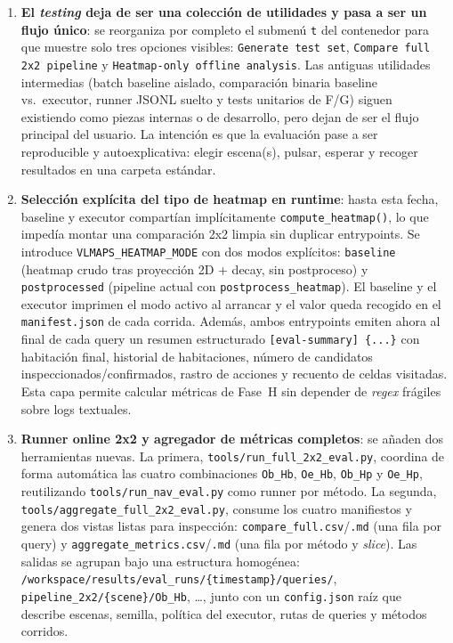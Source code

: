 \documentclass[11pt,a4paper]{article}
\begin{document}
\begin{enumerate}

  \item \textbf{El \textit{testing} deja de ser una colección de utilidades y
        pasa a ser un flujo único}: se reorganiza por completo el submenú
        \texttt{t} del contenedor para que muestre solo tres opciones visibles:
        \texttt{Generate test set}, \texttt{Compare full 2x2 pipeline} y
        \texttt{Heatmap-only offline analysis}. Las antiguas utilidades
        intermedias (batch baseline aislado, comparación binaria baseline vs.\
        executor, runner JSONL suelto y tests unitarios de F/G) siguen
        existiendo como piezas internas o de desarrollo, pero dejan de ser el
        flujo principal del usuario. La intención es que la evaluación pase a
        ser reproducible y autoexplicativa: elegir escena(s), pulsar, esperar y
        recoger resultados en una carpeta estándar.

  \item \textbf{Selección explícita del tipo de heatmap en runtime}: hasta esta
        fecha, baseline y executor compartían implícitamente
        \texttt{compute\_heatmap()}, lo que impedía montar una comparación 2x2
        limpia sin duplicar entrypoints. Se introduce
        \texttt{VLMAPS\_HEATMAP\_MODE} con dos modos explícitos:
        \texttt{baseline} (heatmap crudo tras proyección 2D + decay, sin
        postproceso) y \texttt{postprocessed} (pipeline actual con
        \texttt{postprocess\_heatmap}). El baseline y el executor imprimen el
        modo activo al arrancar y el valor queda recogido en el
        \texttt{manifest.json} de cada corrida. Además, ambos entrypoints
        emiten ahora al final de cada query un resumen estructurado
        \texttt{[eval-summary] \{...\}} con habitación final, historial de
        habitaciones, número de candidatos inspeccionados/confirmados, rastro
        de acciones y recuento de celdas visitadas. Esta capa permite
        calcular métricas de Fase~H sin depender de \emph{regex} frágiles sobre
        logs textuales.

  \item \textbf{Runner online 2x2 y agregador de métricas completos}: se añaden
        dos herramientas nuevas. La primera,
        \texttt{tools/run\_full\_2x2\_eval.py}, coordina de forma automática las
        cuatro combinaciones \texttt{Ob\_Hb}, \texttt{Oe\_Hb},
        \texttt{Ob\_Hp} y \texttt{Oe\_Hp}, reutilizando
        \texttt{tools/run\_nav\_eval.py} como runner por método. La segunda,
        \texttt{tools/aggregate\_full\_2x2\_eval.py}, consume los cuatro
        manifiestos y genera dos vistas listas para inspección:
        \texttt{compare\_full.csv}/\texttt{.md} (una fila por query) y
        \texttt{aggregate\_metrics.csv}/\texttt{.md} (una fila por método y
        \emph{slice}). Las salidas se agrupan bajo una estructura homogénea:
        \texttt{/workspace/results/eval\_runs/\{timestamp\}/queries/},
        \texttt{pipeline\_2x2/\{scene\}/Ob\_Hb}, \ldots,
        junto con un \texttt{config.json} raíz que describe escenas, semilla,
        política del executor, rutas de queries y métodos corridos.


\end{enumerate}
\end{document}
